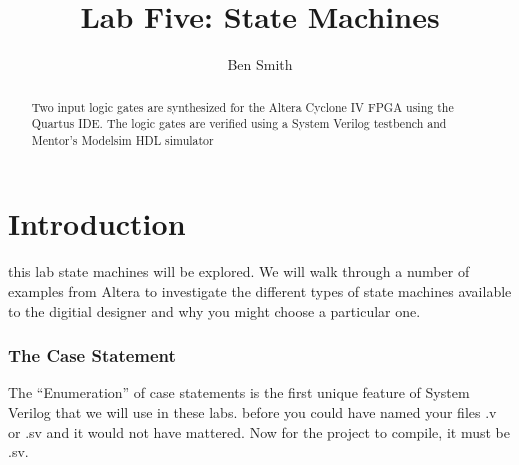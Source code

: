 
\newcommand{\TITLE}{Lab Five: State Machines}
\newcommand{\KEYWORDS}{Logic Gates, Verilog, FPGA, Signaltap, Synthesis}
\newcommand{\ABSTRACT}{Two input logic gates are synthesized for the Altera Cyclone IV FPGA using the Quartus IDE. The logic gates are verified using a System Verilog testbench and Mentor's Modelsim HDL simulator}
\title{Lab Five: State Machines}
\author{Ben Smith}




  \maketitle
    \begin{abstract}
      Two input logic gates are synthesized for the Altera Cyclone IV FPGA using the Quartus IDE. The logic gates are verified using a System Verilog testbench and Mentor's Modelsim HDL simulator
    \end{abstract}
\section{ Introduction}
   this lab state machines will be explored. We will walk through a number of examples from Altera to investigate the different types of state machines available to the digitial designer and why you might choose a particular one.

    \subsubsection{The Case Statement}
     The ``Enumeration'' of case statements is the first unique feature of System Verilog that we will use in these labs. before you could have named your files .v or .sv and it would not have mattered. Now for the project to compile, it must be .sv.

